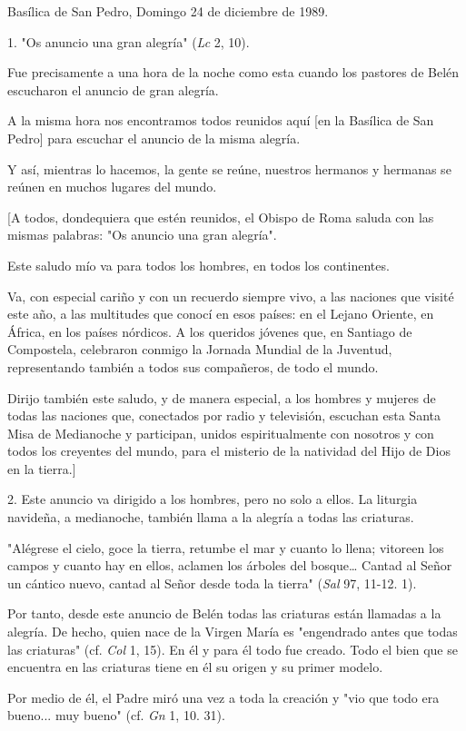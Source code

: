 Basílica de San Pedro, Domingo 24 de diciembre de 1989.

1. "Os anuncio una gran alegría" (\emph{Lc} 2, 10).

Fue precisamente a una hora de la noche como esta cuando los pastores de
Belén escucharon el anuncio de gran alegría.

A la misma hora nos encontramos todos reunidos aquí {[}en la Basílica de
San Pedro{]} para escuchar el anuncio de la misma alegría.

Y así, mientras lo hacemos, la gente se reúne, nuestros hermanos y
hermanas se reúnen en muchos lugares del mundo.

{[}A todos, dondequiera que estén reunidos, el Obispo de Roma saluda con
las mismas palabras: "Os anuncio una gran alegría".

Este saludo mío va para todos los hombres, en todos los continentes.

Va, con especial cariño y con un recuerdo siempre vivo, a las naciones
que visité este año, a las multitudes que conocí en esos países: en el
Lejano Oriente, en África, en los países nórdicos. A los queridos
jóvenes que, en Santiago de Compostela, celebraron conmigo la Jornada
Mundial de la Juventud, representando también a todos sus compañeros, de
todo el mundo.

Dirijo también este saludo, y de manera especial, a los hombres y
mujeres de todas las naciones que, conectados por radio y televisión,
escuchan esta Santa Misa de Medianoche y participan, unidos
espiritualmente con nosotros y con todos los creyentes del mundo, para
el misterio de la natividad del Hijo de Dios en la tierra.{]}

2. Este anuncio va dirigido a los hombres, pero no solo a ellos. La
liturgia navideña, a medianoche, también llama a la alegría a todas las
criaturas.

"Alégrese el cielo, goce la tierra, retumbe el mar y cuanto lo llena;
vitoreen los campos y cuanto hay en ellos, aclamen los árboles del
bosque\ldots{} Cantad al Señor un cántico nuevo, cantad al Señor desde
toda la tierra" (\emph{Sal} 97, 11-12. 1).

Por tanto, desde este anuncio de Belén todas las criaturas están
llamadas a la alegría. De hecho, quien nace de la Virgen María es
"engendrado antes que todas las criaturas" (cf. \emph{Col} 1, 15). En él
y para él todo fue creado. Todo el bien que se encuentra en las
criaturas tiene en él su origen y su primer modelo.

Por medio de él, el Padre miró una vez a toda la creación y "vio que
todo era bueno... muy bueno" (cf. \emph{Gn} 1, 10. 31).

